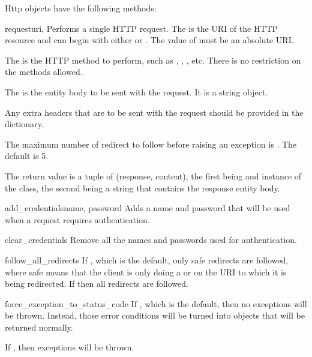 Http objects have the following methods:

\begin{methoddesc}[Http]{request}{uri, }
Performs a single HTTP request.
The  is the URI of the HTTP resource and can begin with either  or . The value of  must be an absolute URI.

The  is the HTTP method to perform, such as , , , etc. There is no restriction
on the methods allowed.

The  is the entity body to be sent with the request. It is a string
object.

Any extra headers that are to be sent with the request should be provided in the
 dictionary.

The maximum number of redirect to follow before raising an exception is . The default is 5.

The return value is a tuple of (response, content), the first being and instance of the
 class, the second being a string that contains the response entity body.
\end{methoddesc}

\begin{methoddesc}[Http]{add_credentials}{name, password}
Adds a name and password that will be used when a request 
requires authentication.
\end{methoddesc}

\begin{methoddesc}[Http]{clear_credentials}{}
Remove all the names and passwords used for authentication.
\end{methoddesc}

\begin{memberdesc}[Http]{follow_all_redirects}
If , which is the default, only safe redirects are followed, where
safe means that the client is only doing a  or  on the
URI to which it is being redirected. If  then all redirects are followed.
\end{memberdesc}

\begin{memberdesc}[Http]{force_exception_to_status_code}
If , which is the default, then no  exceptions will be thrown. Instead,
those error conditions will be turned into  objects
that will be returned normally.

If , then exceptions will be thrown.
\end{memberdesc}

